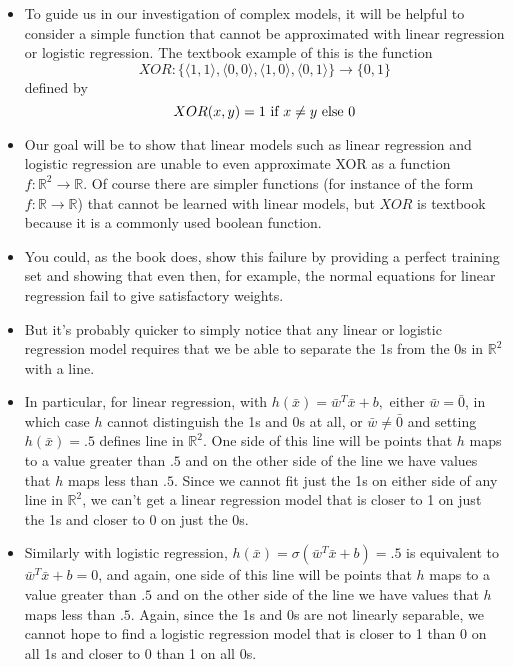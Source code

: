 \documentclass{article}
\begin{document}
\begin{itemize}

\item To guide us in our investigation of complex models, it will be helpful to consider a simple function that cannot be approximated with linear regression or logistic regression.  The textbook example of this is the function $$XOR: \{\langle1,1\rangle, \langle0,0\rangle ,\langle1,0\rangle, \langle0,1\rangle\} \rightarrow \{0, 1\}$$ defined by 
$$XOR(x, y) = 1 \hbox { if } x\neq y \hbox{ else } 0$$

\item Our goal will be to show that linear models such as linear regression and logistic regression are unable to even approximate XOR  as a function $f:\mathbb{R}^{2} \rightarrow \mathbb{R}$.  Of course there are simpler functions (for instance of the form $f:\mathbb{R} \rightarrow \mathbb{R}$) that cannot be learned with linear models, but $XOR$ is textbook because it is a commonly used boolean function.

\item You could, as the book does, show this failure by providing a perfect training set and showing that even then, for example, the normal equations for linear regression fail to give satisfactory weights.  

\item But it's probably quicker to simply notice that any linear or logistic regression model requires that we be able to separate the 1s from the 0s in $\mathbb{R}^{2}$ with a line.

\item In particular, for linear regression,  with $h(\bar{x}) = \bar{w}^{T}\bar{x} + b,$ either $\bar{w} = \bar{0}$, in which case $h$ cannot distinguish the 1s and 0s at all, or  $\bar{w} \neq \bar{0}$ and setting $h(\bar{x}) = .5$ defines line in $\mathbb{R}^2$.  One side of this line will be points that $h$ maps to a value greater than $.5$ and on the other side of the line we have values that $h$ maps less than $.5$.   Since we cannot fit just the 1s on either side of any line in $\mathbb{R}^2$, we can't get a linear regression model that is closer to 1 on just the 1s and closer to 0 on just the 0s.

\item Similarly with logistic regression, 
$h(\bar{x}) = \sigma(\bar{w}^{T}\bar{x} + b) = .5$ is equivalent to $\bar{w}^{T}\bar{x} + b = 0$, and again, one side of this line will be points that $h$ maps to a value greater than $.5$ and on the other side of the line we have values that $h$ maps less than $.5$.  Again, since the 1s and 0s are not linearly separable, we cannot hope to find a logistic regression model that is closer to 1 than 0 on all 1s and closer to 0 than 1 on all 0s.


\end{itemize}
\end{document}
